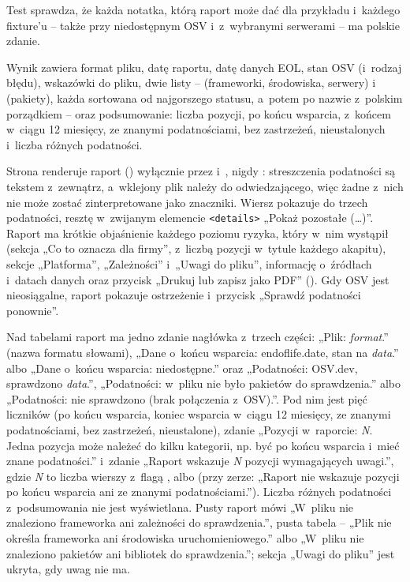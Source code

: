Test  sprawdza, że każda notatka, którą raport może dać dla przykładu
i~każdego fixture'u -- także przy niedostępnym OSV i~z~wybranymi serwerami -- ma polskie
zdanie.

Wynik  zawiera format pliku, datę raportu, datę danych EOL, stan OSV
(i~rodzaj błędu), wskazówki do pliku, dwie listy --  (frameworki,
środowiska, serwery) i~ (pakiety), każda sortowana od najgorszego
statusu, a~potem po nazwie z~polskim porządkiem -- oraz podsumowanie: liczba pozycji, po końcu
wsparcia, z~końcem w~ciągu 12 miesięcy, ze znanymi podatnościami, bez zastrzeżeń,
nieustalonych i~liczba różnych podatności.

Strona renderuje raport () wyłącznie przez 
i~, nigdy : streszczenia podatności są tekstem
z~zewnątrz, a~wklejony plik należy do odwiedzającego, więc żadne z~nich nie może zostać
zinterpretowane jako znaczniki. Wiersz pokazuje do trzech podatności, resztę w~zwijanym elemencie
\texttt{<details>} „Pokaż pozostałe (…)”. Raport ma krótkie objaśnienie każdego poziomu ryzyka, który w~nim
wystąpił (sekcja „Co to oznacza dla firmy”, z~liczbą pozycji w~tytule każdego akapitu),
sekcje „Platforma”, „Zależności” i~„Uwagi do pliku”, informację o~źródłach i~datach danych
oraz przycisk „Drukuj lub zapisz jako PDF” (). Gdy OSV jest
nieosiągalne, raport pokazuje ostrzeżenie i~przycisk „Sprawdź podatności ponownie”.

Nad tabelami raport ma jedno zdanie nagłówka z~trzech części: „Plik: \emph{format}.”
(nazwa formatu słowami), „Dane o~końcu wsparcia: endoflife.date, stan na \emph{data}.” albo
„Dane o~końcu wsparcia: niedostępne.” oraz „Podatności: OSV.dev, sprawdzono \emph{data}.”,
„Podatności: w~pliku nie było pakietów do sprawdzenia.” albo „Podatności: nie sprawdzono
(brak połączenia z~OSV).”. Pod nim jest pięć liczników (po końcu wsparcia, koniec wsparcia
w~ciągu 12 miesięcy, ze znanymi podatnościami, bez zastrzeżeń, nieustalone), zdanie
„Pozycji w~raporcie: \emph{N}. Jedna pozycja może należeć do kilku kategorii, np. być po
końcu wsparcia i~mieć znane podatności.” i~zdanie „Raport wskazuje \emph{N} pozycji
wymagających uwagi.”, gdzie \emph{N} to liczba wierszy z~flagą ,
 albo  (przy zerze: „Raport nie wskazuje pozycji po
końcu wsparcia ani ze znanymi podatnościami.”). Liczba różnych podatności z~podsumowania
nie jest wyświetlana. Pusty raport mówi „W~pliku nie znaleziono frameworka ani zależności do
sprawdzenia.”, pusta tabela -- „Plik nie określa frameworka ani środowiska
uruchomieniowego.” albo „W~pliku nie znaleziono pakietów ani bibliotek do sprawdzenia.”;
sekcja „Uwagi do pliku” jest ukryta, gdy uwag nie ma.

